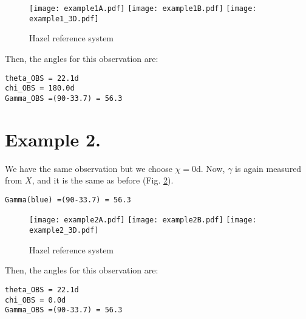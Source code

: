 \documentclass[11pt,a4paper]{article}
\begin{document}
\begin{figure}[ht!]
\centering
\texttt{[image: example1A.pdf]}
\texttt{[image: example1B.pdf]}
\texttt{[image: example1\_3D.pdf]}
\caption{Hazel reference system}
\label{fig:example1}
\end{figure}
\clearpage
Then, the angles for this observation are:
\begin{lstlisting}
theta_OBS = 22.1d
chi_OBS = 180.0d
Gamma_OBS =(90-33.7) = 56.3
\end{lstlisting}


\section{Example 2.}
We have the same observation but we choose $\chi=$0d. Now, $\gamma$ is again measured from $X$, and it is the same as before (Fig. \ref{fig:example2}).
\begin{lstlisting}
Gamma(blue) =(90-33.7) = 56.3
\end{lstlisting}

\begin{figure}[ht!]
\centering
\texttt{[image: example2A.pdf]}
\texttt{[image: example2B.pdf]}
\texttt{[image: example2\_3D.pdf]}
\caption{Hazel reference system}
\label{fig:example2}
\end{figure}


Then, the angles for this observation are:
\begin{lstlisting}
theta_OBS = 22.1d
chi_OBS = 0.0d
Gamma_OBS =(90-33.7) = 56.3
\end{lstlisting}
\end{document}
